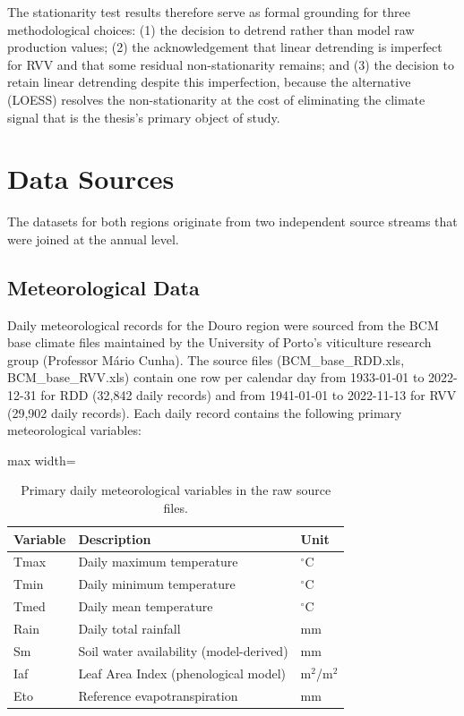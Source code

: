 The stationarity test results therefore serve as formal grounding for three methodological choices: (1) the decision to detrend rather than model raw production values; (2) the acknowledgement that linear detrending is imperfect for RVV and that some residual non-stationarity remains; and (3) the decision to retain linear detrending despite this imperfection, because the alternative (LOESS) resolves the non-stationarity at the cost of eliminating the climate signal that is the thesis's primary object of study.



\section{Data Sources}\label{sec:data_sources}

The datasets for both regions originate from two independent source streams that were joined at the annual level.


\subsection{Meteorological Data}\label{sub:meteorological_data}

Daily meteorological records for the Douro region were sourced from the BCM base climate files maintained by the University of Porto's viticulture research group (Professor Mário Cunha). The source files (BCM\_base\_RDD.xls, BCM\_base\_RVV.xls) contain one row per calendar day from 1933-01-01 to 2022-12-31 for RDD (32,842 daily records) and from 1941-01-01 to 2022-11-13 for RVV (29,902 daily records). Each daily record contains the following primary meteorological variables:

\begin{table}[htbp]
  \centering
  \caption{Primary daily meteorological variables in the raw source files.}\label{tab:ch3d_1}
  \small
  \begin{adjustbox}{max width=\textwidth}
    \begin{tabularx}{\textwidth}{llX}
    \toprule
    \textbf{Variable} & \textbf{Description} & \textbf{Unit} \\
    \midrule
    Tmax & Daily maximum temperature & $^\circ$C \\
    Tmin & Daily minimum temperature & $^\circ$C \\
    Tmed & Daily mean temperature & $^\circ$C \\
    Rain & Daily total rainfall & mm \\
    Sm   & Soil water availability (model-derived) & mm \\
    Iaf  & Leaf Area Index (phenological model) & m$^2$/m$^2$ \\
    Eto  & Reference evapotranspiration & mm \\
    \bottomrule
  \end{tabularx}
  \end{adjustbox}

\end{table}


